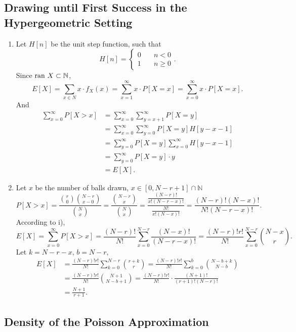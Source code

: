 \documentclass[11pt,a4paper]{article}
\author{Group 37}
\subtitle{Assignment}
\begin{document}
\maketitle

\subsection{Drawing until First Success in the Hypergeometric Setting}

\begin{enumerate}[label=\roman*)]
\item
Let $H[n]$ be the unit step function, such that 
$$H[n]=\left\{\begin{aligned}
0&\quad n<0\\1&\quad n\geqslant 0
\end{aligned}\right..$$
Since ${\rm ran}\ X\subset \mathbb{N}$,
$$E[X]=\sum_{x\in N}x\cdot f_X(x)=\sum_{x=1}^\infty x\cdot P[X=x]=\sum_{x=0}^\infty x\cdot P[X=x].$$
And
\begin{align*}
\sum_{x=0}^\infty P[X>x]
&=\sum_{x=0}^\infty\sum_{y=x+1}^\infty P[X=y]\\
&=\sum_{x=0}^\infty\sum_{y=0}^\infty P[X=y]H[y-x-1]\\
&=\sum_{y=0}^\infty P[X=y]\sum_{x=0}^\infty H[y-x-1]\\
&=\sum_{y=0}^\infty P[X=y]\cdot y\\
&=E[X].
\end{align*}
\item
Let $x$ be the number of balls drawn, $x\in [0,N-r+1]\cap\mathbb{N}$
$$P[X>x]=\frac{\binom{r}{0}\binom{N-r}{x-0}}{\binom{N}{x}}=\frac{\binom{N-r}{x}}{\binom{N}{x}}=\frac{\frac{(N-r)!}{x!(N-r-x)!}}{\frac{N!}{x!(N-x)!}}=\frac{(N-r)!(N-x)!}{N!(N-r-x)!}.$$
According to i),
$$E[X]=\sum_{x=0}^\infty P[X>x]=\frac{(N-r)!}{N!}\sum_{x=0}^{N-r} \frac{(N-x)!}{(N-r-x)!}=\frac{(N-r)!r!}{N!}\sum_{x=0}^{N-r}\binom{N-x}{r}.$$
Let $k=N-r-x$, $b=N-r$,
\begin{align*}
E[X]&=\frac{(N-r)!r!}{N!}\sum_{k=0}^{N-r}\binom{r+k}{r}
=\frac{(N-r)!r!}{N!}\sum_{k=0}^{b}\binom{N-b+k}{N-b}\\
&=\frac{(N-r)!r!}{N!}\binom{N+1}{N-b+1}
=\frac{(N-r)!r!}{N!}\cdot\frac{(N+1)!}{(r+1)!(N-r)!}\\
&=\frac{N+1}{r+1}.
\end{align*}
\end{enumerate}

\subsection{Density of the Poisson Approximation}
\end{document}
